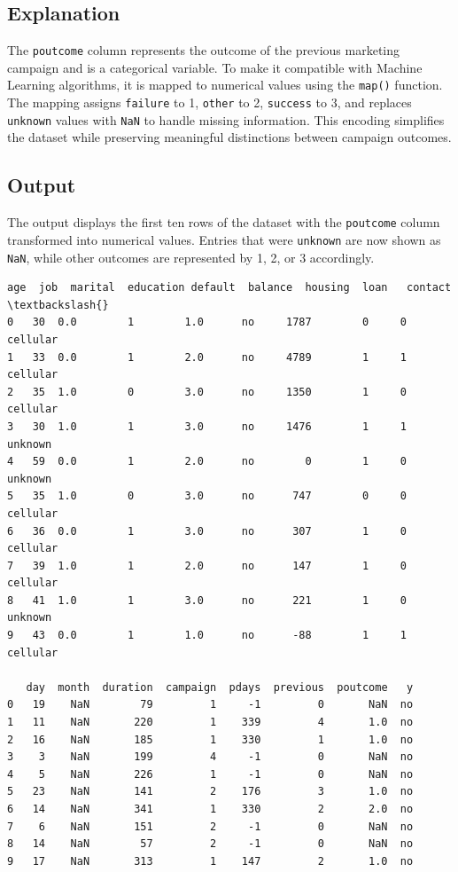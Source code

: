 \documentclass[11pt]{article}
\makeatletter
\newcommand{\boxspacing}{\kern\kvtcb@left@rule\kern\kvtcb@boxsep}
\newcommand{\prompt}[4]{
        {\ttfamily\llap{{\color{#2}[#3]:\hspace{3pt}#4}}\vspace{-\baselineskip}}
    }
\makeatother
\begin{document}
\subsection*{Explanation}
The \texttt{poutcome} column represents the outcome of the previous marketing campaign and is a categorical variable. To make it compatible with Machine Learning algorithms, it is mapped to numerical values using the \texttt{map()} function. The mapping assigns \texttt{failure} to 1, \texttt{other} to 2, \texttt{success} to 3, and replaces \texttt{unknown} values with \texttt{NaN} to handle missing information. This encoding simplifies the dataset while preserving meaningful distinctions between campaign outcomes.

\subsection*{Output}
The output displays the first ten rows of the dataset with the \texttt{poutcome} column transformed into numerical values. Entries that were \texttt{unknown} are now shown as \texttt{NaN}, while other outcomes are represented by 1, 2, or 3 accordingly.
            \begin{tcolorbox}[breakable, size=fbox, boxrule=.5pt, pad at break*=1mm, opacityfill=0]
\prompt{Out}{outcolor}{15}{\boxspacing}
\begin{Verbatim}[commandchars=\\\{\}]
   age  job  marital  education default  balance  housing  loan   contact  \textbackslash{}
0   30  0.0        1        1.0      no     1787        0     0  cellular
1   33  0.0        1        2.0      no     4789        1     1  cellular
2   35  1.0        0        3.0      no     1350        1     0  cellular
3   30  1.0        1        3.0      no     1476        1     1   unknown
4   59  0.0        1        2.0      no        0        1     0   unknown
5   35  1.0        0        3.0      no      747        0     0  cellular
6   36  0.0        1        3.0      no      307        1     0  cellular
7   39  1.0        1        2.0      no      147        1     0  cellular
8   41  1.0        1        3.0      no      221        1     0   unknown
9   43  0.0        1        1.0      no      -88        1     1  cellular

   day  month  duration  campaign  pdays  previous  poutcome   y
0   19    NaN        79         1     -1         0       NaN  no
1   11    NaN       220         1    339         4       1.0  no
2   16    NaN       185         1    330         1       1.0  no
3    3    NaN       199         4     -1         0       NaN  no
4    5    NaN       226         1     -1         0       NaN  no
5   23    NaN       141         2    176         3       1.0  no
6   14    NaN       341         1    330         2       2.0  no
7    6    NaN       151         2     -1         0       NaN  no
8   14    NaN        57         2     -1         0       NaN  no
9   17    NaN       313         1    147         2       1.0  no
\end{Verbatim}
\end{tcolorbox}
        
\end{document}
